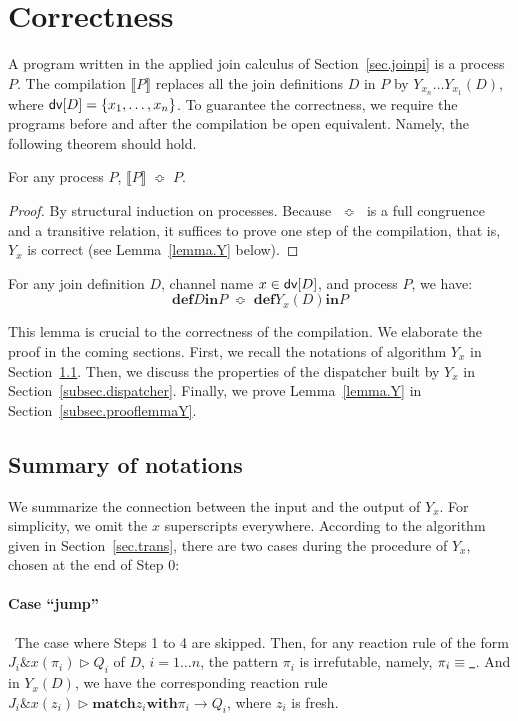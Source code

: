 \documentclass{LMCS}
\newcommand{\forget}[1]{}
\newcommand{\pt}{\pi}
\newcommand{\kwd}[1]{\ensuremath{\mathbf{#1}}}
\newcommand{\prefix}[1]{\mathopen{}\mathrel{\kwd {#1}}}
\newcommand{\infix}[1]{\mathrel{\kwd {#1}}}
\newcommand{\set}[1]{\{#1\}}
\renewcommand{\_}{\mathord{\rule[-.25ex]{1ex}{.15ex}}}
\newcommand{\C}[1]{\llbracket#1\rrbracket}
\newcommand{\para}[2]{#1\mathop{\&}#2}
\newcommand{\define}[2]{\prefix{def} #1 \infix{in} #2}
\newcommand{\matchone}[3]{\prefix{match} #1 \infix{with} #2
  \rightarrow #3}
\newcommand{\reaction}[2]{#1 \triangleright #2}
\newcommand{\pseq}{\;\mathop{\Bumpeq}\;}
\newcommand{\dv}[1]{\mbox{\sf dv}[#1]}
\begin{document}
\section{Correctness}
\label{sec.correct}

A program written in the applied join calculus of
Section~\ref{sec.joinpi} is a process $P$. The compilation $\C{P}$
replaces all the join definitions $D$ in $P$ by $Y_{x_n}\ldots
Y_{x_1}(D)$, where $\dv{D} = \set{x_1,\ldots,x_n}$. To guarantee the
correctness, we require the programs before and after the compilation
be open equivalent. Namely, the following theorem should hold.
\begin{thm}\label{th.joinpi.correct}
  For any process $P$, $\C{P} \pseq P$.
\end{thm}
\begin{proof}
  By structural induction on processes. Because $\pseq$ is a full
  congruence and a transitive relation, it suffices to prove one step
  of the compilation, that is, $Y_x$ is correct (see
  Lemma~\ref{lemma.Y} below). \forget{\qed}
\end{proof}
\begin{lem}\label{lemma.Y}
  For any join definition $D$, channel name $x \in \dv{D}$, and
  process $P$, we have:
  $$\define{D}{P} \pseq \define{Y_x(D)}{P}$$
\end{lem}
This lemma is crucial to the correctness of the compilation. \iffalse
The proof relies on the properties of the meet semi-lattice
constructed from the pattern arguments. In particular the proof
exploits the deterministic semantics of the ML pattern matching in the
dispatcher, which is built following the topological order of the
lattice. \fi We elaborate the proof in the coming sections.
First, we recall the notations of algorithm $Y_x$ in
Section~\ref{subsec.Yx}. Then, we discuss the properties of the
dispatcher built by $Y_x$ in Section~\ref{subsec.dispatcher}. Finally,
we prove Lemma~\ref{lemma.Y} in Section~\ref{subsec.prooflemmaY}.

\subsection{Summary of notations}
\label{subsec.Yx}

We summarize the connection between the input and the output of $Y_x$.
For simplicity, we omit the $x$ superscripts everywhere.
According to the algorithm given in Section~\ref{sec.trans},
there are two cases during the procedure of $Y_x$, chosen at the end
of Step 0:
\paragraph{\bf Case ``jump''}\ The case where Steps 1 to 4 are skipped. Then,
  for any reaction rule of the form $\reaction{\para{J_i}{x(\pt_i)}}{Q_i}$
  of $D$, $i=1\ldots n$, the pattern $\pt_i$ is irrefutable, namely,
  $\pt_i \equiv \_$. And in $Y_x(D)$, we have the corresponding
  reaction rule
  $\reaction{\para{J_i}{x(z_i)}}{\matchone{z_i}{\pt_i}{Q_i}}$, where $z_i$
  is fresh.
\end{document}
